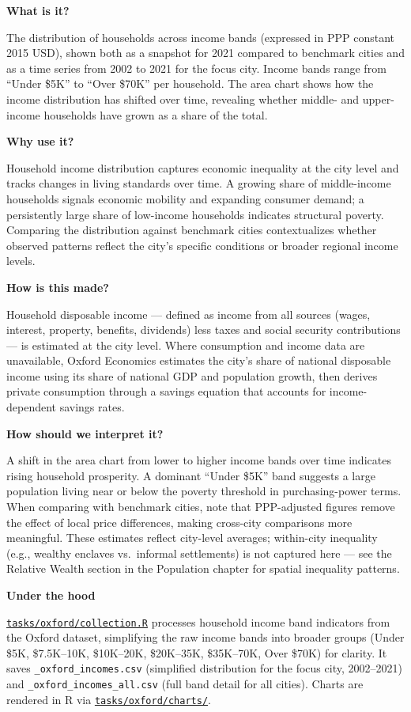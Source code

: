 \documentclass[
  letterpaper,
  DIV=11,
  numbers=noendperiod]{scrreprt}
\begin{document}
\textbf{What is it?}

The distribution of households across income bands (expressed in PPP
constant 2015 USD), shown both as a snapshot for 2021 compared to
benchmark cities and as a time series from 2002 to 2021 for the focus
city. Income bands range from ``Under \$5K'' to ``Over \$70K'' per
household. The area chart shows how the income distribution has shifted
over time, revealing whether middle- and upper-income households have
grown as a share of the total.

\textbf{Why use it?}

Household income distribution captures economic inequality at the city
level and tracks changes in living standards over time. A growing share
of middle-income households signals economic mobility and expanding
consumer demand; a persistently large share of low-income households
indicates structural poverty. Comparing the distribution against
benchmark cities contextualizes whether observed patterns reflect the
city's specific conditions or broader regional income levels.

\textbf{How is this made?}

Household disposable income --- defined as income from all sources
(wages, interest, property, benefits, dividends) less taxes and social
security contributions --- is estimated at the city level. Where
consumption and income data are unavailable, Oxford Economics estimates
the city's share of national disposable income using its share of
national GDP and population growth, then derives private consumption
through a savings equation that accounts for income-dependent savings
rates.

\textbf{How should we interpret it?}

A shift in the area chart from lower to higher income bands over time
indicates rising household prosperity. A dominant ``Under \$5K'' band
suggests a large population living near or below the poverty threshold
in purchasing-power terms. When comparing with benchmark cities, note
that PPP-adjusted figures remove the effect of local price differences,
making cross-city comparisons more meaningful. These estimates reflect
city-level averages; within-city inequality (e.g., wealthy enclaves
vs.~informal settlements) is not captured here --- see the Relative
Wealth section in the Population chapter for spatial inequality
patterns.

\textbf{Under the hood}

\href{../tasks/oxford/collection.R}{\texttt{tasks/oxford/collection.R}}
processes household income band indicators from the Oxford dataset,
simplifying the raw income bands into broader groups (Under \$5K,
\$7.5K--10K, \$10K--20K, \$20K--35K, \$35K--70K, Over \$70K) for
clarity. It saves \texttt{\_oxford\_incomes.csv} (simplified
distribution for the focus city, 2002--2021) and
\texttt{\_oxford\_incomes\_all.csv} (full band detail for all cities).
Charts are rendered in R via
\href{../tasks/oxford/charts/}{\texttt{tasks/oxford/charts/}}.
\end{document}
